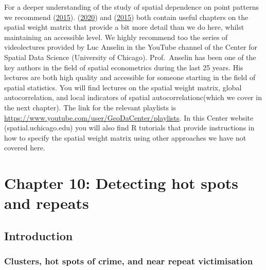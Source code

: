 \documentclass[
  krantz2]{krantz}
\begin{document}
For a deeper understanding of the study of spatial dependence on point patterns we recommend (\protect\hyperlink{ref-Baddeley_2016}{2015}). (\protect\hyperlink{ref-Haining_2020}{2020}) and (\protect\hyperlink{ref-Darmofal_2015}{2015}) both contain useful chapters on the spatial weight matrix that provide a bit more detail than we do here, whilst maintaining an accessible level. We highly recommend too the series of videolectures provided by Luc Anselin in the YouTube channel of the Center for Spatial Data Science (University of Chicago). Prof.~Anselin has been one of the key authors in the field of spatial econometrics during the last 25 years. His lectures are both high quality and accessible for someone starting in the field of spatial statistics. You will find lectures on the spatial weight matrix, global autocorrelation, and local indicators of spatial autocorrelationc(which we cover in the next chapter). The link for the relevant playlists is \url{https://www.youtube.com/user/GeoDaCenter/playlists}. In this Center website (spatial.uchicago.edu) you will also find R tutorials that provide instructions in how to specify the spatial weight matrix using other approaches we have not covered here.

\hypertarget{chapter-10-detecting-hot-spots-and-repeats}{%
\chapter{Chapter 10: Detecting hot spots and repeats}\label{chapter-10-detecting-hot-spots-and-repeats}}

\hypertarget{introduction-8}{%
\section{Introduction}\label{introduction-8}}

\hypertarget{clusters-hot-spots-of-crime-and-near-repeat-victimisation}{%
\subsection{Clusters, hot spots of crime, and near repeat victimisation}\label{clusters-hot-spots-of-crime-and-near-repeat-victimisation}}
\end{document}
